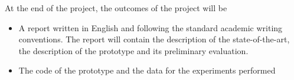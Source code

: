 \documentclass[a4paper]{article}
\begin{document}
\begin{description}[style=nextline]
\item[Outcomes]
At the end of the project, the outcomes of the project will be
\begin{itemize}
\item A report written in English and following the standard academic writing
    conventions. The report will contain the description of the 
state-of-the-art, the description of the prototype and its preliminary 
evaluation.
\item The code of the prototype and the data for the experiments performed
\end{itemize}
   
\end{description}

\printbibliography
\end{document}
